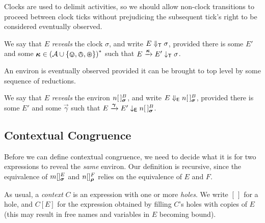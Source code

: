 \documentclass[orivec,envcountsame]{llncs}
\begin{document}
Clocks are used to delimit activities, so we should allow non-clock transitions
to proceed between clock ticks without prejudicing the subsequent tick's
right to be considered eventually observed.

\begin{definition}
We say that $E$ \emph{reveals} the clock $\sigma$, and write $E
\mathrel{\Downarrow_{\textsf{T}}} \sigma$, provided there is some $E'$ and some $\vec{\kappa} \in
\left( \actions \cup \{ \tin, \tout, \topen \}\right)^*$ such that $E
\Does{\vec{\kappa}} E' \ExhibitsT \sigma$.
\end{definition}

An environ is eventually observed provided it can be brought to top
level by some sequence of reductions.

\begin{definition}

We say that $E$ \emph{reveals} the environ $\locv{n}{\,}{B}{\vec{\sigma}}$,
and write $E \RevealsE \locv{n}{\,}{B}{\vec{\sigma}}$, provided there is
some $E'$ and some $\vec{\gamma}$ such that $E \Does{\vec{\gamma}}
E' \ExhibitsE \locv{n}{\,}{B}{\vec{\sigma}}$.

\end{definition}


\subsection{Contextual Congruence}
\label{sec:contextual-congruence}

Before we can define contextual congruence, we need to decide what it is for 
two expressions to reveal the \emph{same} environ. Our definition is
recursive, since the equivalence of $\locv{m}{}{E}{\vec{\sigma}}$ and
$\locv{n}{}{F}{\vec{\rho}}$ relies on the equivalence of $E$ and
$F$.

As usual, a \emph{context} $C$ is an expression with one or more
\emph{holes}. We write $[\,]$ for a hole, and $C[E]$ for the expression
obtained by filling $C$'s holes with copies of $E$ (this may result
in free names and variables in $E$ becoming bound).
\end{document}
